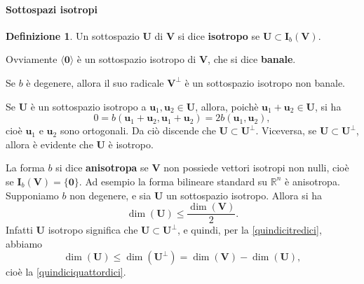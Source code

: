 \documentclass{article}
\theoremstyle{plain}
\theoremstyle{definition}
\newtheorem{defn}{Definizione}[section]
\theoremstyle{remark}
\begin{document}
\vspace{10pt}

\paragraph{Sottospazi isotropi}
\begin{bxthm}
\begin{defn}
Un sottospazio $\mathbf{U}$ di $\mathbf{V}$ si dice \textbf{isotropo} se 
$\mathbf{U} \subset \mathbf{I}_b(\mathbf{V})$.     
\end{defn}
\end{bxthm}

\vspace{10pt}

Ovviamente $\langle\mathbf{0}\rangle$ è un sottospazio isotropo di $\mathbf{V}$, che si dice \textbf{banale}. 

\vspace{10pt}

Se $b$ è degenere, allora il suo radicale $\mathbf{V}^\perp$ è un sottospazio isotropo non banale.

\vspace{10pt}

Se $\mathbf{U}$ è un sottospazio isotropo a $\mathbf{u}_1, \mathbf{u}_2 \in \mathbf{U}$, allora, poichè $\mathbf{u}_1 + \mathbf{u}_2 \in \mathbf{U}$, si ha
\begin{equation}
0 = b(\mathbf{u}_1 + \mathbf{u}_2, \mathbf{u}_1 + \mathbf{u}_2) = 2b(\mathbf{u}_1, \mathbf{u}_2),
\end{equation}
cioè $\mathbf{u}_1$ e $\mathbf{u}_2$ sono ortogonali. Da ciò discende che $\mathbf{U} \subset \mathbf{U}^\perp$. 
Viceversa, se $\mathbf{U} \subset \mathbf{U}^\perp$, allora è evidente che $\mathbf{U}$ è isotropo.

\vspace{10pt}

La forma $b$ si dice \textbf{anisotropa} se $\mathbf{V}$ non possiede vettori isotropi non nulli, cioè se 
$\mathbf{I}_b(\mathbf{V}) = \{\mathbf{0}\}$. Ad esempio la forma bilineare standard su $\mathbb{R}^n$ è 
anisotropa. Supponiamo $b$ non degenere, e sia $\mathbf{U}$ un sottospazio isotropo. Allora si ha
\begin{equation}\label{quindiciquattordici}
\dim(\mathbf{U}) \leq \dfrac{\dim(\mathbf{V})}{2}. 
\end{equation}
Infatti $\mathbf{U}$ isotropo significa che $\mathbf{U} \subset \mathbf{U}^\perp$, e quindi, per la \ref{quindicitredici}, 
abbiamo
\[\dim(\mathbf{U}) \leq \dim(\mathbf{U}^\perp) = \dim(\mathbf{V}) - \dim(\mathbf{U}),\]
cioè la \ref{quindiciquattordici}.
\end{document}
